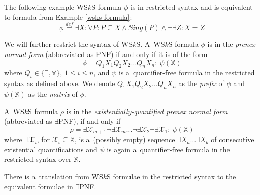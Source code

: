 	  \noindent\hrulefill
  \begin{example}
  The following example WS$k$S formula $\phi$ is in restricted syntax and is
  equivalent to formula from Example \ref{wsks-formula}:
  \begin{equation}
   \phi \overset{\mathit{def}}{=} \exists X: \forall P: P \subseteq X \wedge
   \mathit{Sing}(P) \wedge \neg\exists Z: X = Z
  \end{equation}
   \hrulefill
  \end{example}\label{wsks-formula-restricted}
	
We will further restrict the syntax of WS$k$S. A~WS$k$S formula $\phi$ is in the
\emph{prenex normal form} (abbreviated as PNF) if and only if it is of the form
\begin{equation}
\phi = Q_1X_1Q_2X_2\ldots Q_nX_n:\ \psi(\mathds{X})
\end{equation} where 
$Q_i \in \{\exists,\forall\}$, $1 \leq i \leq n$, and $\psi$ is a~quantifier-free formula
in the restricted syntax as defined above. We denote $Q_1X_1Q_2X_2\ldots Q_nX_n$
as the \emph{prefix} of $\phi$ and $\psi(\mathds{X})$ as the \emph{matrix} of
$\phi$.
	
A~WS$k$S formula $\rho$ is in the \emph{existentially-quantified prenex normal
form} (abbreviated as $\exists$PNF), if and only if \begin{equation}\rho =
\exists \mathcal{X}_{m+1}\neg\exists \mathcal{X}_m\ldots\neg\exists
\mathcal{X}_2\neg\exists \mathcal{X}_1:\ \psi(\mathds{X})
\end{equation} where
$\exists\mathcal{X}_i$, for $\mathcal{X}_i \subseteq \mathds{X}$, is a~(possibly
empty) sequence $\exists X_a\ldots\exists X_b$ of consecutive existential
quantifications and $\psi$ is again a~quantifier-free formula in the restricted
syntax over $\mathds{X}$.
	
	\begin{prop}
There is a~translation from WS$k$S formulae in the restricted syntax to the
equivalent formulae in $\exists$PNF.
	\end{prop}
	
